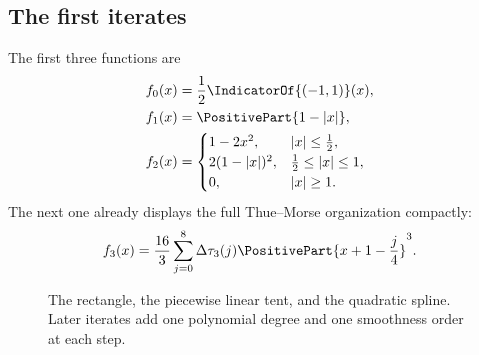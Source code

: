 \documentclass[11pt,oneside]{article}
\theoremstyle{definition}
\theoremstyle{remark}
\begin{document}
\subsection{The first iterates}

The first three functions are
\begin{align}
 f_0(x)&=\frac12\IndicatorOf{(-1,1)}(x),
 \label{repeated2:eq:f0-explicit}\\
 f_1(x)&=\PositivePart{1-|x|},
 \label{repeated2:eq:f1-explicit}\\
 f_2(x)&=
 \begin{cases}
 1-2x^2,&|x|\le\tfrac12,\\
 2(1-|x|)^2,&\tfrac12\le|x|\le1,\\
 0,&|x|\ge1.
 \end{cases}
 \label{repeated2:eq:f2-explicit}
\end{align}
The next one already displays the full Thue--Morse organization compactly:
\begin{equation}
 f_3(x)=\frac{16}{3}\sum_{j=0}^{8}\Delta\tau_3(j)
 \PositivePart{x+1-\frac j4}^{3}.
 \label{repeated2:eq:f3-truncated-power}
\end{equation}

\begin{figure}[htbp]
\centering
{}
\caption{The rectangle, the piecewise linear tent, and the quadratic spline.  Later
iterates add one polynomial degree and one smoothness order at each step.}
\label{repeated2:fig:first-iterates}
\end{figure}
\end{document}

